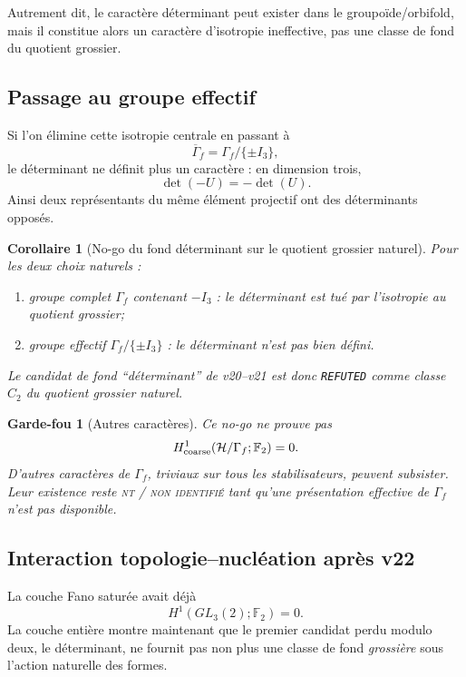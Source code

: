 \documentclass[11pt,a4paper]{article}
\newtheorem{corollary}[theorem]{Corollaire}
\newtheorem{guardrail}[theorem]{Garde-fou}
\newcommand{\statusNT}{\textsc{nt / non identifié}}
\begin{document}
Autrement dit, le caractère déterminant peut exister dans le groupoïde/orbifold, mais il constitue alors un caractère d'isotropie ineffective, pas une classe de fond du quotient grossier.

\subsection{Passage au groupe effectif}

Si l'on élimine cette isotropie centrale en passant à
\[
\overline{\Gamma}_f
=
\Gamma_f/\{\pm I_3\},
\]
le déterminant ne définit plus un caractère : en dimension trois,
\[
\det(-U)
=
-\det(U).
\]
Ainsi deux représentants du même élément projectif ont des déterminants opposés.

\begin{corollary}[No-go du fond déterminant sur le quotient grossier naturel]\label{cor:v22-det-background-nogo}
Pour les deux choix naturels :
\begin{enumerate}[label=\textup{(\roman*)}]
\item groupe complet $\Gamma_f$ contenant $-I_3$ : le déterminant est tué par l'isotropie au quotient grossier;
\item groupe effectif $\Gamma_f/\{\pm I_3\}$ : le déterminant n'est pas bien défini.
\end{enumerate}
Le candidat de fond ``déterminant'' de v20--v21 est donc \texttt{REFUTED} comme classe $C_2$ du quotient grossier naturel.
\end{corollary}

\begin{guardrail}[Autres caractères]
Ce no-go ne prouve pas
\[
H^1_{\rm coarse}
(\mathcal H/\Gamma_f;\mathbb F_2)=0.
\]
D'autres caractères de $\Gamma_f$, triviaux sur tous les stabilisateurs, peuvent subsister. Leur existence reste \statusNT{} tant qu'une présentation effective de $\Gamma_f$ n'est pas disponible.
\end{guardrail}

\subsection{Interaction topologie--nucléation après v22}

La couche Fano saturée avait déjà
\[
H^1(GL_3(2);\mathbb F_2)=0.
\]
La couche entière montre maintenant que le premier candidat perdu modulo deux, le déterminant, ne fournit pas non plus une classe de fond \emph{grossière} sous l'action naturelle des formes.
\end{document}
